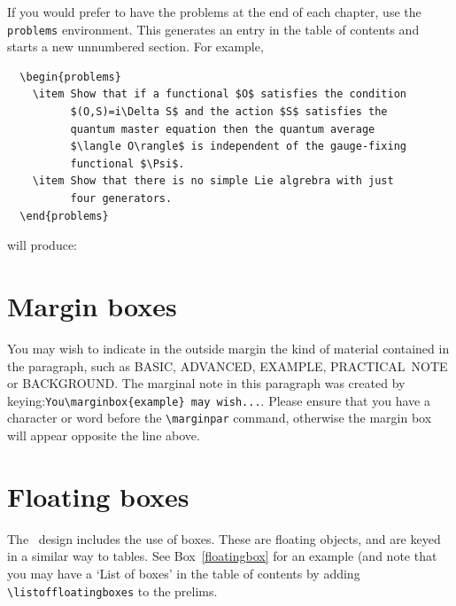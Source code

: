 If you would prefer to have the problems at the end of each chapter, use the \verb"problems" environment. This generates an entry in the table of contents and starts a new unnumbered section. For example,
\begin{verbatim}
  \begin{problems}
    \item Show that if a functional $O$ satisfies the condition
          $(O,S)=i\Delta S$ and the action $S$ satisfies the
          quantum master equation then the quantum average
          $\langle O\rangle$ is independent of the gauge-fixing
          functional $\Psi$.
    \item Show that there is no simple Lie algrebra with just
          four generators.
  \end{problems}
\end{verbatim}
will produce:

\section{Margin boxes}

You may wish to indicate in the outside margin the kind of material contained in the paragraph, such as \hbox{BASIC}, \hbox{ADVANCED}, \hbox{EXAMPLE}, \hbox{PRACTICAL NOTE} or \hbox{BACKGROUND}. The marginal note in this paragraph was created by keying:\linebreak \verb"You\marginbox{example} may wish...". Please ensure that you have a character or word before the \verb"\marginpar" command, otherwise the margin box will appear opposite the line above.

\section{Floating boxes}

The \cambridge\ design includes the use of boxes. These are floating objects, and are keyed in a similar way to tables. See Box~\ref{floatingbox} for an example (and note that you may have a `List of boxes' in the table of contents by adding \verb"\listoffloatingboxes" to the prelims.

